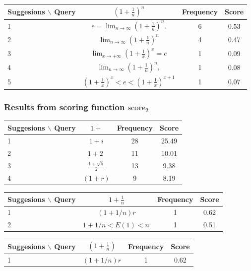 \documentclass[12pt]{article} %
\begin{document}
\begin{center}
\begin{tabular}{lccc}
Suggesions $\backslash$ Query  & $ (1+\frac 1 n)^n $ & Frequency & Score \\
\hline
 1 &  $ e=\lim_{n\to\infty}\left(1+\frac{1}{n}\right)^{n}. $ & 6 & 0.53 \\
 2 &  $  \lim_{n\to\infty}\left(1+\frac{1}{n}\right)^{n} $ & 4 & 0.47 \\
 3 &  $ \lim_{x\to+\infty}\left(1+\frac{1}{x}\right)^{x}=e $ & 1 & 0.09 \\
 4 &  $ \lim_{n\to\infty}\left(1+\frac{1}{n}\right)^{n}, $ & 1 & 0.08 \\
 5 &  $ \left(1+\frac{1}{x}\right)^{x}<e<\left(1+\frac{1}{x}\right)^{x+1} $ & 1 & 0.07 \\
\end{tabular}
\end{center}

\subsubsection{Results from scoring function $\text{score}_2$}
\begin{center}
\begin{tabular}{lccc}
Suggesions $\backslash$ Query  & $ 1+ $ & Frequency & Score \\
\hline
 1 &  $ 1+i $ & 28 & 25.49 \\
 2 &  $ 1+2\;  $ & 11 & 10.01 \\
 3 &  $ \scriptstyle\frac{1+\sqrt{5}}{2} $ & 13 & 9.38 \\
 4 &  $ (1+r) $ & 9 & 8.19 \\
\end{tabular}
\end{center}

\begin{center}
\begin{tabular}{lccc}
Suggesions $\backslash$ Query  & $ 1+\frac 1 n $ & Frequency & Score \\
\hline
 1 &  $ (1+1/n)r $ & 1 & 0.62 \\
 2 &  $ 1+1/n<E(1)<n\,  $ & 1 & 0.51 \\
\end{tabular}
\end{center}

\begin{center}
\begin{tabular}{lccc}
Suggesions $\backslash$ Query  & $ (1+\frac 1 n) $ & Frequency & Score \\
\hline
 1 &  $ (1+1/n)r $ & 1 & 0.62 \\
\end{tabular}
\end{center}
\end{document}
